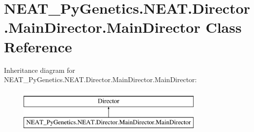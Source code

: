 \hypertarget{class_n_e_a_t___py_genetics_1_1_n_e_a_t_1_1_director_1_1_main_director_1_1_main_director}{}\section{N\+E\+A\+T\+\_\+\+Py\+Genetics.\+N\+E\+A\+T.\+Director.\+Main\+Director.\+Main\+Director Class Reference}
\label{class_n_e_a_t___py_genetics_1_1_n_e_a_t_1_1_director_1_1_main_director_1_1_main_director}
Inheritance diagram for N\+E\+A\+T\+\_\+\+Py\+Genetics.\+N\+E\+A\+T.\+Director.\+Main\+Director.\+Main\+Director\+:\begin{figure}[H]
\begin{center}
\leavevmode
\includegraphics[height=2.000000cm]{class_n_e_a_t___py_genetics_1_1_n_e_a_t_1_1_director_1_1_main_director_1_1_main_director}
\end{center}
\end{figure}
